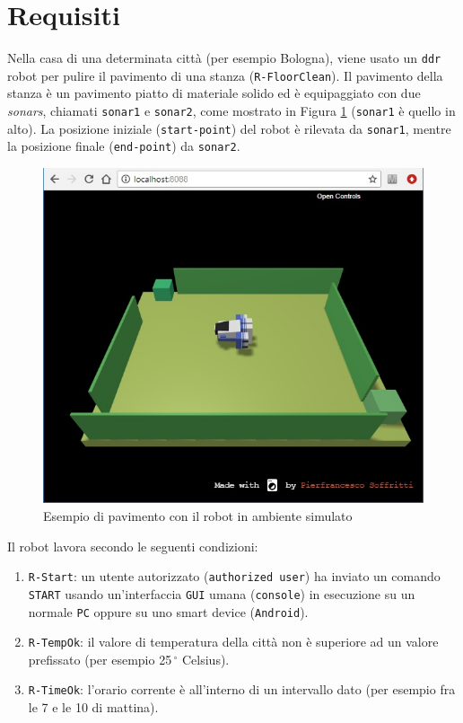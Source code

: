 \documentclass{llncs}
\newcommand{\action}[1]{\texttt{#1}\xspace}
\newcommand{\code}[1]{{\color{blue}\small{\texttt{#1}}}}
\newcommand{\labelsec}[1]{\label{sec:#1}}
\begin{document}
\section{Requisiti}
\labelsec{Requirements}
Nella casa di una determinata città (per esempio Bologna), viene usato un \action{ddr} robot per pulire il pavimento di una stanza (\code{R-FloorClean}). \newline \indent 
Il pavimento della stanza è un pavimento piatto di materiale solido ed è equipaggiato con due \textit{sonars}, chiamati \code{sonar1} e \code{sonar2}, come mostrato in Figura \ref{fig:virtualrobot} (\code{sonar1} è quello in alto). La posizione iniziale (\code{start-point}) del robot è rilevata da \code{sonar1}, mentre la posizione finale (\code{end-point}) da \code{sonar2}.

\begin{figure}
	\centering
	\includegraphics[scale=0.7]{img/virtualRobot.jpg}
	\caption{Esempio di pavimento con il robot in ambiente simulato}
	\label{fig:virtualrobot}
\end{figure}

Il robot lavora secondo le seguenti condizioni:
\begin{enumerate}
\item \code{R-Start}: un utente autorizzato (\code{authorized user}) ha inviato un comando \action{START} usando un'interfaccia \action{GUI} umana (\code{console}) in esecuzione su un normale \action{PC} oppure su uno smart device (\action{Android}).
\item \code{R-TempOk}: il valore di temperatura della città non è superiore ad un valore prefissato (per esempio 25\,$^{\circ}$ Celsius).
\item \code{R-TimeOk}: l'orario corrente è all'interno di un intervallo dato (per esempio fra le 7 e le 10 di mattina).
\end{enumerate}
\end{document}
